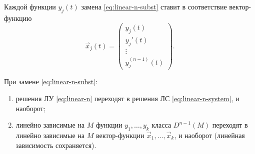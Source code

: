 \documentclass[12pt,a4paper]{article}
\numberwithin{equation}{section}
\newcommand{\vect}[1]{\vec{#1}}
\begin{document}
Каждой функции \(y_j(t)\) замена \eqref{eq:linear-n-subst} ставит в соответствие вектор-функцию
\[
\vect{x}_j(t)=\begin{pmatrix}y_j(t)\\y_j'(t)\\\vdots\\y_j^{(n-1)}(t)\end{pmatrix}.
\]

\begin{lemmaHSE}[О замене]
При замене \eqref{eq:linear-n-subst}:
\begin{enumerate}
\item решения ЛУ \eqref{eq:linear-n} переходят в решения ЛС \eqref{eq:linear-n-system}, и наоборот;
\item линейно зависимые на \(M\) функции \(y_1,\ldots,y_k\) класса \(D^{n-1}(M)\) переходят в линейно зависимые на \(M\) вектор-функции \(\vect{x}_1,\ldots,\vect{x}_k\), и наоборот (линейная зависимость сохраняется).
\end{enumerate}
\end{lemmaHSE}
\end{document}

